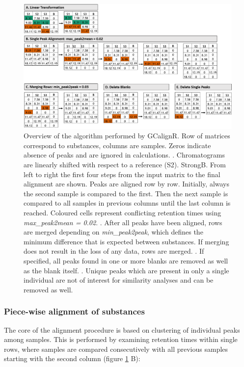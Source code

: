 \begin{figure}[htbp]
  \centering
  \includegraphics[width=13cm]{figures/algorithm}
  \caption{Overview of the algorithm performed by GCalignR. Row of matrices correspond to substances, columns are samples. Zeros indicate absence of peaks and are ignored in calculations. . Chromatograms are linearly shifted with respect to a reference (S2). Strong{B}. From left to right the first four steps from the input matrix to the final alignment are shown. Peaks are aligned row by row. Initially, always the second sample is compared to the first. Then the next sample is compared to all samples in previous columns until the last column is reached. Coloured cells represent conflicting retention times using \textit{max{\_}peak2mean = 0.02}. . After all peaks have been aligned, rows are merged depending on \textit{min{\_}peak2peak}, which defines the minimum difference that is expected between substances. If merging does not result in the loss of any data, rows are merged. . If specified, all peaks found in one or more blanks are removed as well as the blank itself. . Unique peaks which are present in only a single individual are not of interest for similarity analyses and can be removed as well.}
  \label{figure:algorithm}
\end{figure}

\subsubsection{Piece-wise alignment of substances}

The core of the alignment procedure is based on clustering of individual
peaks among samples. This is performed by examining retention times
within single rows, where samples are compared consecutively with all
previous samples starting with the second column (figure
\ref{figure:algorithm} B):\par


